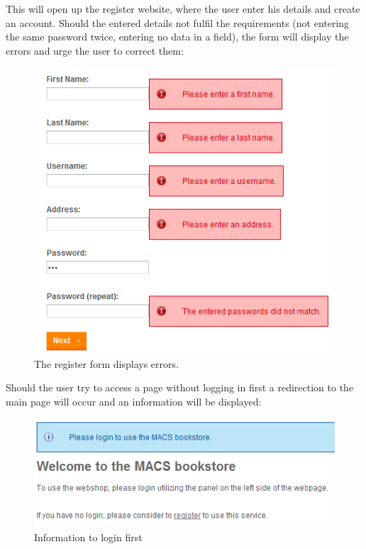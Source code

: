 This will open up the register website, where the user enter his details and create an account.
Should the entered details not fulfil the requirements (not entering the same password twice, entering no data in a field), the form will display the errors and urge the user to correct them:

\begin{figure}[H]
\begin{center}
\includegraphics[scale=1]{gfx/login_errors.png}
\caption{The register form displays errors.}
\label{fig:register_errors}
\end{center}
\end{figure}

Should the user try to access a page without logging in first a redirection to the main page will occur and an information will be displayed:

\begin{figure}[H]
\begin{center}
\includegraphics[scale=1]{gfx/access_denied.png}
\caption{Information to login first}
\label{fig:access_denied}
\end{center}
\end{figure}

